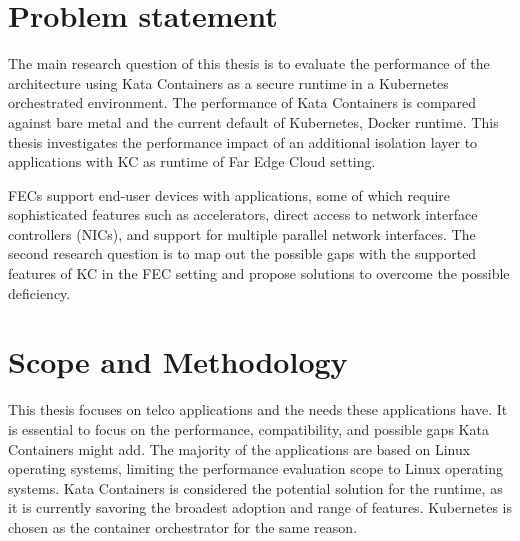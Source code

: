 \section{Problem statement}
\label{section:intro_problemstatement}

The main research question of this thesis is to evaluate the performance of the architecture using Kata Containers as a secure runtime in a Kubernetes orchestrated environment. The performance of Kata Containers is compared against bare metal and the current default of Kubernetes, Docker runtime. This thesis investigates the performance impact of an additional isolation layer to applications with KC as runtime of Far Edge Cloud setting.

FECs support end-user devices with applications, some of which require sophisticated features such as accelerators, direct access to network interface controllers (NICs), and support for multiple parallel network interfaces. The second research question is to map out the possible gaps with the supported features of KC in the FEC setting and propose solutions to overcome the possible deficiency.





\section{Scope and Methodology}
\label{section:intro_scopemethodology}

This thesis focuses on telco applications and the needs these applications have. It is essential to focus on the performance, compatibility, and possible gaps Kata Containers might add. The majority of the applications are based on Linux operating systems, limiting the performance evaluation scope to Linux operating systems. Kata Containers is considered the potential solution for the runtime, as it is currently savoring the broadest adoption and range of features. Kubernetes is chosen as the container orchestrator for the same reason.

